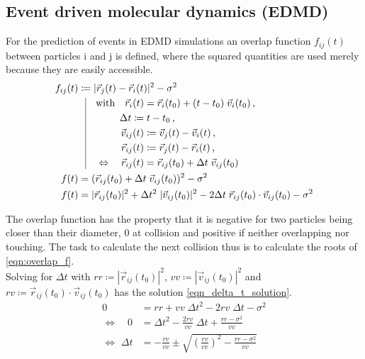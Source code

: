 \subsection{Event driven molecular dynamics (EDMD)}
\label{sec:EDMD}
For the prediction of events in EDMD simulations an overlap function $f_{ij}(t)$ between particles i and j is defined, where the squared quantities are used merely because they are easily accessible.\\
\begin{align}
f_{ij}(t) & \coloneqq  | \vec{r}_j(t) - \vec{r}_i(t) |^2 - \sigma^2\\
          & \; \; \, \vrule
  \begin{aligned}[t]
    \quad \text{with} \quad \vec{r}_i(t) &= \vec{r}_i(t_0) + (t-t_0) \; \vec{v}_i(t_0) \, \text{,}\\
    \Delta t \coloneqq & \; t-t_0  \, \text{,} \\ 
    \vec{v}_{ij}(t) &\coloneqq  \vec{v}_j(t) - \vec{v}_i(t) \, \text{,}\\
    \vec{r}_{ij}(t) &\coloneqq  \vec{r}_j(t) - \vec{r}_i(t) \, \text{,}\\
    \Leftrightarrow \quad \vec{r}_{ij}(t) &= \vec{r}_{ij}(t_0) + \Delta t \; \vec{v}_{ij}(t_0)
  \end{aligned}\\
f(t)  & = ( \vec{r}_{ij}(t_0) +  \Delta t \;  \vec{v}_{ij}(t_0))^2 -\sigma^2 \\
\label{eqn:overlap_f}
f(t)  & = |\vec{r}_{ij}(t_0)|^2 + \Delta t ^2 \; |\vec{v}_{ij}(t_0)|^2 - 2 \Delta t \; \vec{r}_{ij}(t_0) \cdot \vec{v}_{ij}(t_0)  -\sigma^2
\end{align}  

The overlap function has the property that it is negative for two particles being closer than their diameter, 0 at collision and positive if neither overlapping nor touching. The task to calculate the next collision thus is to calculate the roots of \autoref{eqn:overlap_f}.\\

Solving for $\Delta t$ with $rr \coloneqq |\vec{r}_{ij}(t_0)|^2  $, $vv \coloneqq |\vec{v}_{ij}(t_0)|^2  $ and  $ rv \coloneqq \vec{r}_{ij}(t_0) \cdot \vec{v}_{ij}(t_0) $ has the solution \autoref{eqn_delta_t_solution}.
\begin{align}
0 &= rr + vv \; \Delta t ^2  - 2 rv \; \Delta t  -\sigma^2\\
\Leftrightarrow \quad 0 &= \Delta t ^2 - \frac{2rv}{vv} \; \Delta t + \frac{rr - \sigma^2 }{vv}\\
\label{eqn_delta_t_solution}
\Leftrightarrow \, \, \Delta t &= - \frac{rv}{vv} \pm \sqrt{\left(\frac{rv}{vv}\right)^2 - \frac{rr - \sigma^2 }{vv}}
\end{align}

